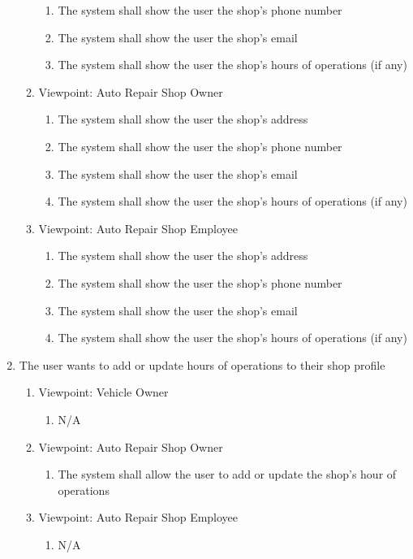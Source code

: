 \documentclass[12pt]{article}
\begin{document}
\begin{enumerate}[resume*=business_events]
\begin{enumerate}[VP\arabic*.]
\begin{enumerate}
			            \item The system shall show the user the shop's phone number
			            \item The system shall show the user the shop's email
			            \item The system shall show the user the shop's hours of operations (if any)
		            \end{enumerate}
		      \item Viewpoint: Auto Repair Shop Owner
		            \begin{enumerate}
			            \item The system shall show the user the shop's address
			            \item The system shall show the user the shop's phone number
			            \item The system shall show the user the shop's email
			            \item The system shall show the user the shop's hours of operations (if any)
		            \end{enumerate}
		      \item Viewpoint: Auto Repair Shop Employee
		            \begin{enumerate}
			            \item The system shall show the user the shop's address
			            \item The system shall show the user the shop's phone number
			            \item The system shall show the user the shop's email
			            \item The system shall show the user the shop's hours of operations (if any)
		            \end{enumerate}
	      \end{enumerate}
	\item The user wants to add or update hours of operations to their shop profile
	      \begin{enumerate}[VP\arabic*.]
		      \item Viewpoint: Vehicle Owner
		            \begin{enumerate}
			            \item[] N/A
		            \end{enumerate}
		      \item Viewpoint: Auto Repair Shop Owner
		            \begin{enumerate}
			            \item The system shall allow the user to add or update the shop's hour of operations
		            \end{enumerate}
		      \item Viewpoint: Auto Repair Shop Employee
		            \begin{enumerate}
			            \item[] N/A
		            \end{enumerate}
	      \end{enumerate}
\end{enumerate}
\end{document}
